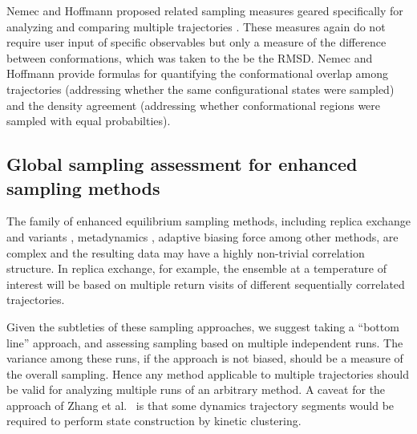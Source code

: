 Nemec and Hoffmann proposed related sampling measures geared specifically for analyzing and comparing multiple trajectories \cite{Nemec2017}.
These measures again do not require user input of specific observables but only a measure of the difference between conformations, which was taken to the be the RMSD.
Nemec and Hoffmann provide formulas for quantifying the conformational overlap among trajectories (addressing whether the same configurational states were sampled) and the density agreement (addressing whether conformational regions were  sampled with equal probabilties).


\subsection{Global sampling assessment for enhanced sampling methods}
The family of enhanced equilibrium sampling methods, including replica exchange and variants \cite{Swendsen-1986,Sugita1999,Okamoto-2000}, metadynamics \cite{Bussi2006a,Laio2008}, adaptive biasing force \cite{Darve2001,Darve2008,Comer2015} among other methods, are complex and the resulting data may have a highly non-trivial correlation structure.
In replica exchange, for example, the ensemble at a temperature of interest will be based on multiple return visits of different sequentially correlated trajectories.

Given the subtleties of these sampling approaches, we suggest taking a ``bottom line'' approach, and assessing sampling based on multiple independent runs.
The variance among these runs, if the approach is not biased, should be a measure of the overall sampling.
Hence any method applicable to multiple trajectories should be valid for analyzing multiple runs of an arbitrary method.
A caveat for the approach of Zhang et al.\ \cite{Zhang2010} is that some dynamics trajectory segments would be required to perform state construction by kinetic clustering.
